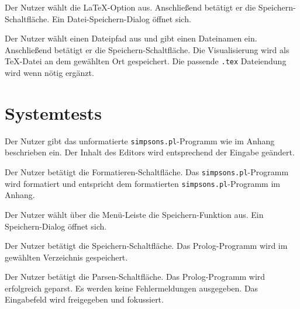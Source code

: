 \documentclass[parskip=full,11pt,twoside]{scrartcl}
\begin{document}
{Der Nutzer wählt die LaTeX-Option aus. Anschließend betätigt er die Speichern-Schaltfläche.}
{Ein Datei-Speichern-Dialog öffnet sich.}

{Der Nutzer wählt einen Dateipfad aus und gibt einen Dateinamen ein. Anschließend betätigt er die Speichern-Schaltfläche.}
{Die Visualisierung wird als TeX-Datei an dem gewählten Ort gespeichert. Die passende \texttt{.tex} Dateiendung wird wenn nötig ergänzt.}

\begin{minipage}{\linewidth}
\end{minipage}

\section{Systemtests}


{Der Nutzer gibt das unformatierte \texttt{simpsons.pl}-Programm wie im Anhang beschrieben ein.}
{Der Inhalt des Editors wird entsprechend der Eingabe geändert.}

{Der Nutzer betätigt die Formatieren-Schaltfläche.}
{Das \texttt{simpsons.pl}-Programm wird formatiert und entspricht dem formatierten \texttt{simpsons.pl}-Programm im Anhang.}

{Der Nutzer wählt über die Menü-Leiste die Speichern-Funktion aus.}
{Ein Speichern-Dialog öffnet sich.}

{Der Nutzer betätigt die Speichern-Schaltfläche.}
{Das Prolog-Programm wird im gewählten Verzeichnis gespeichert.}

{Der Nutzer betätigt die Parsen-Schaltfläche.}
{Das Prolog-Programm wird erfolgreich geparst. Es werden keine Fehlermeldungen ausgegeben. Das Eingabefeld wird freigegeben und fokussiert.}
\end{document}
